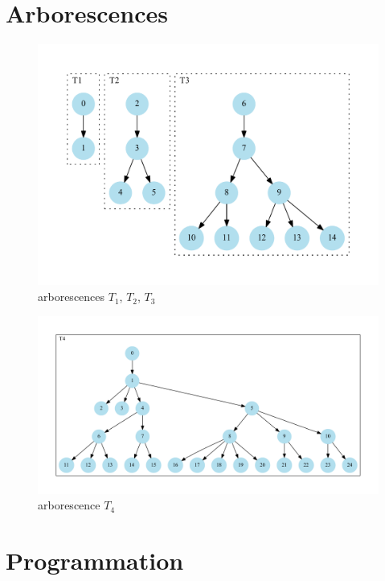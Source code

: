 \chapter{Arborescences}\label{arbo}

\begin{figure}[h]
\begin{center}
\includegraphics[scale=0.6]{./images/t1_2_3.pdf}
\end{center}
\caption{arborescences $T_1$, $T_2$, $T_3$}
\end{figure}
\clearpage

\begin{figure}[h]
\begin{center}
\includegraphics[scale=0.4]{./images/t4.pdf}
\end{center}
\caption{arborescence $T_4$}
\end{figure}
\clearpage

\chapter{Programmation}

